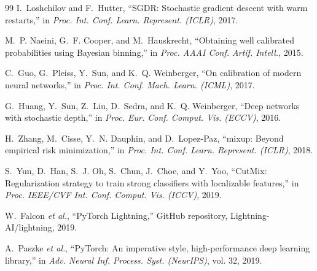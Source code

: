 \begin{thebibliography}{99}
I.~Loshchilov and F.~Hutter, ``SGDR: Stochastic gradient descent with warm
restarts,'' in \emph{Proc. Int. Conf. Learn. Represent. (ICLR)}, 2017.

M.~P. Naeini, G.~F. Cooper, and M.~Hauskrecht, ``Obtaining well calibrated
probabilities using Bayesian binning,'' in \emph{Proc. AAAI Conf. Artif.
Intell.}, 2015.

C.~Guo, G.~Pleiss, Y.~Sun, and K.~Q. Weinberger, ``On calibration of modern
neural networks,'' in \emph{Proc. Int. Conf. Mach. Learn. (ICML)}, 2017.

G.~Huang, Y.~Sun, Z.~Liu, D.~Sedra, and K.~Q. Weinberger, ``Deep networks with
stochastic depth,'' in \emph{Proc. Eur. Conf. Comput. Vis. (ECCV)}, 2016.

H.~Zhang, M.~Cisse, Y.~N. Dauphin, and D.~Lopez-Paz, ``mixup: Beyond empirical
risk minimization,'' in \emph{Proc. Int. Conf. Learn. Represent. (ICLR)}, 2018.

S.~Yun, D.~Han, S.~J. Oh, S.~Chun, J.~Choe, and Y.~Yoo, ``CutMix:
Regularization strategy to train strong classifiers with localizable
features,'' in \emph{Proc. IEEE/CVF Int. Conf. Comput. Vis. (ICCV)}, 2019.

W.~Falcon \emph{et al.}, ``PyTorch Lightning,'' GitHub repository,
Lightning-AI/lightning, 2019.

A.~Paszke \emph{et al.}, ``PyTorch: An imperative style, high-performance deep
learning library,'' in \emph{Adv. Neural Inf. Process. Syst. (NeurIPS)}, vol.
32, 2019.

\end{thebibliography}
